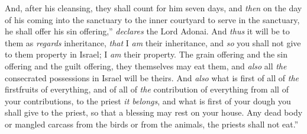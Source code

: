 \begin{biblechapter}
\verse And, after his cleansing, they shall count for him seven days,
\verse and \textit{then} on the day of his coming into the sanctuary to the inner courtyard to serve in the sanctuary, he shall offer his sin offering,” \textit{declares} the Lord Adonai.
\verse And \textit{thus} it will be to them as \textit{regards} inheritance, \textit{that} I \textit{am} their inheritance, and \textit{so} you shall not give to them property in Israel; I \textit{am} their property.
\verse The grain offering and the sin offering and the guilt offering, they themselves may eat them, and \textit{also} all \textit{the} consecrated possessions in Israel will be theirs.
\verse And \textit{also} what is first of all of \textit{the} firstfruits of everything, and of all of \textit{the} contribution of everything from all of your contributions, to the priest \textit{it belongs}, and what is first of your dough you shall give to the priest, so that a blessing may rest on your house.
\verse Any dead body or mangled carcass from the birds or from the animals, the priests shall not eat.”
\end{biblechapter}

